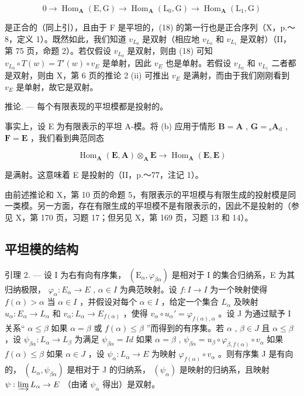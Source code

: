 \[
0 \rightarrow \operatorname{Hom} _ {\mathbf {A}} (\mathrm{E}, \mathrm{G}) \rightarrow \operatorname{Hom} _ {\mathbf {A}} (\mathrm{L} _ {0}, \mathrm{G}) \rightarrow \operatorname{Hom} _ {\mathbf {A}} (\mathrm{L} _ {1}, \mathrm{G})
\]

是正合的（同上引），且由于 F 是平坦的，(18) 的第一行也是正合序列（X，p.～8，定义 1）。既然如此，我们知道 \(v_{L_0}\) 是双射（相应地 \(v_{L_0}\) 和 \(v_{L_1}\) 是双射）（II，第 75 页，命题 2）。若仅假设 \(v_{L_0}\) 是双射，则由 (18) 可知 \(v_{L_0} \circ T(w) = T'(w) \circ v_E\) 是单射，因此 \(v_E\) 也是单射。若假设 \(v_{L_0}\) 和 \(v_{L_1}\) 二者都是双射，则由 X，第 6 页的推论 2 (ii) 可推出 \(v_E\) 是满射，而由于我们刚刚看到 \(v_E\) 是单射，故它是双射。

推论. --- 每个有限表现的平坦模都是投射的。

事实上，设 E 为有限表示的平坦 A-模。将 (b) 应用于情形 \(\mathbf{B} = \mathbf{A}\) , \(\mathbf{G} = {}_{\mathrm{s}}\mathbf{A}_{\mathrm{d}}\) , \(\mathbf{F} = \mathbf{E}\) ，我们看到典范同态

\[
\operatorname{Hom} _ {\mathbf {A}} (\mathbf {E}, \mathbf {A}) \otimes_ {\mathbf {A}} \mathbf {E} \rightarrow \operatorname{Hom} _ {\mathbf {A}} (\mathbf {E}, \mathbf {E})
\]

是满射。这意味着 E 是投射的（II，p.～77，注记 1）。

由前述推论和 X，第 10 页的命题 5，有限表示的平坦模与有限生成的投射模是同一类模。另一方面，存在有限生成的平坦模不是有限表示的，因此不是投射的（参见 X，第 170 页，习题 17；但另见 X，第 169 页，习题 13 和 14）。

\subsection{平坦模的结构}

引理 2. --- 设 I 为右有向有序集， \((\mathrm{E}_{\alpha}, \varphi_{\beta\alpha})\) 是相对于 I 的集合归纳系，E 为其归纳极限， \(\varphi_{\alpha}: E_{\alpha} \to E\) , \(\alpha \in I\) 为典范映射。设 \(f: I \to I\) 为一个映射使得 \(f(\alpha) > \alpha\) 当 \(\alpha \in I\) ，并假设对每个 \(\alpha \in I\) ，给定一个集合 \(L_{\alpha}\) 及映射 \(u_{\alpha}: E_{\alpha} \to L_{\alpha}\) 和 \(v_{\alpha}: L_{\alpha} \to E_{f(\alpha)}\) ，使得 \(v_{\alpha} \circ u_{\alpha}' = \varphi_{f(\alpha),\alpha}\) 。设 J 为通过赋予 I 关系“ \(\alpha \leqslant \beta\) 如果 \(\alpha = \beta\) 或 \(f(\alpha) \leqslant \beta\) ”而得到的有序集。若 \(\alpha\) , \(\beta \in J\) 且 \(\alpha \leqslant \beta\) ，设 \(\psi_{\beta\alpha}: L_{\alpha} \to L_{\beta}\) 为满足 \(\psi_{\beta\alpha} = Id\) 如果 \(\alpha = \beta\) , \(\psi_{\beta\alpha} = u_{\beta} \circ \varphi_{\beta,f(\alpha)} \circ v_{\alpha}\) 如果 \(f(\alpha) \leqslant \beta\) 如果 \(\alpha \in J\) ，设 \(\psi_{\alpha}: L_{\alpha} \to E\) 为映射 \(\varphi_{f(\alpha)} \circ v_{\alpha}\) 。则有序集 J 是有向的， \((L_{\alpha}, \psi_{\beta\alpha})\) 是相对于 J 的归纳系， \((\psi_{\alpha})\) 是映射的归纳系，且映射 \(\psi: \varinjlim L_{\alpha} \to E\) （由诸 \(\psi_{\alpha}\) 得出）是双射。

